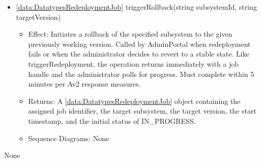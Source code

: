 \begin{description}
\begin{itemize}[noitemsep,nolistsep,leftmargin=-.25cm]
\begin{itemize}[noitemsep,nolistsep]
           \item Sequence Diagrams: None
        \end{itemize}
      \item \textsf{\ref{data:DatatypesRedeploymentJob} triggerRollback(string subsystemId, string targetVersion)}
        \begin{itemize}[noitemsep,nolistsep]
           \item Effect: Initiates a rollback of the specified subsystem to the given previously working version. Called by AdminPortal when redeployment fails or when the administrator decides to revert to a stable state. Like triggerRedeployment, the operation returns immediately with a job handle and the administrator polls for progress. Must complete within 5 minutes per Av2 response measures. 
           \item Returns: A \ref{data:DatatypesRedeploymentJob} object containing the assigned job identifier, the target subsystem, the target version, the start timestamp, and the initial status of IN\_PROGRESS.
           \item Sequence Diagrams: None
        \end{itemize}
    \end{itemize}
      \item[Diagrams:] None
    \end{description}

